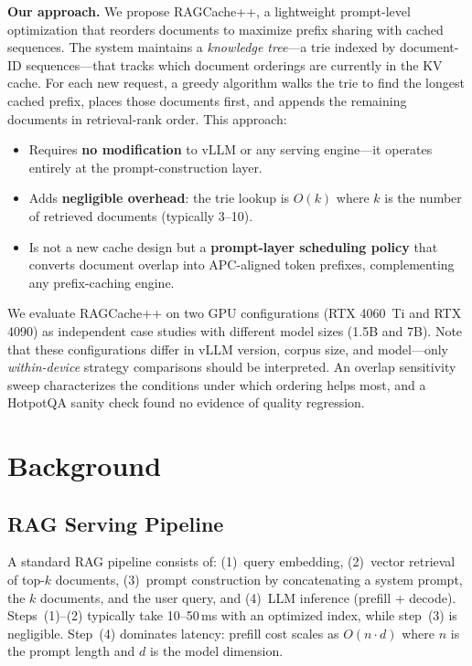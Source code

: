 \documentclass{article}
\begin{document}
\textbf{Our approach.} We propose RAGCache++, a lightweight prompt-level optimization that reorders documents to maximize prefix sharing with cached sequences. The system maintains a \emph{knowledge tree}---a trie indexed by document-ID sequences---that tracks which document orderings are currently in the KV cache. For each new request, a greedy algorithm walks the trie to find the longest cached prefix, places those documents first, and appends the remaining documents in retrieval-rank order. This approach:
\begin{itemize}
\item Requires \textbf{no modification} to vLLM or any serving engine---it operates entirely at the prompt-construction layer.
\item Adds \textbf{negligible overhead}: the trie lookup is $O(k)$ where $k$ is the number of retrieved documents (typically 3--10).
\item Is not a new cache design but a \textbf{prompt-layer scheduling policy} that converts document overlap into APC-aligned token prefixes, complementing any prefix-caching engine.
\end{itemize}

We evaluate RAGCache++ on two GPU configurations (RTX 4060~Ti and RTX 4090) as independent case studies with different model sizes (1.5B and 7B). Note that these configurations differ in vLLM version, corpus size, and model---only \emph{within-device} strategy comparisons should be interpreted. An overlap sensitivity sweep characterizes the conditions under which ordering helps most, and a HotpotQA sanity check found no evidence of quality regression.

\section{Background}
\label{sec:background}

\subsection{RAG Serving Pipeline}

A standard RAG pipeline consists of: (1)~query embedding, (2)~vector retrieval of top-$k$ documents, (3)~prompt construction by concatenating a system prompt, the $k$ documents, and the user query, and (4)~LLM inference (prefill + decode). Steps~(1)--(2) typically take 10--50\,ms with an optimized index, while step~(3) is negligible. Step~(4) dominates latency: prefill cost scales as $O(n \cdot d)$ where $n$ is the prompt length and $d$ is the model dimension.
\end{document}
